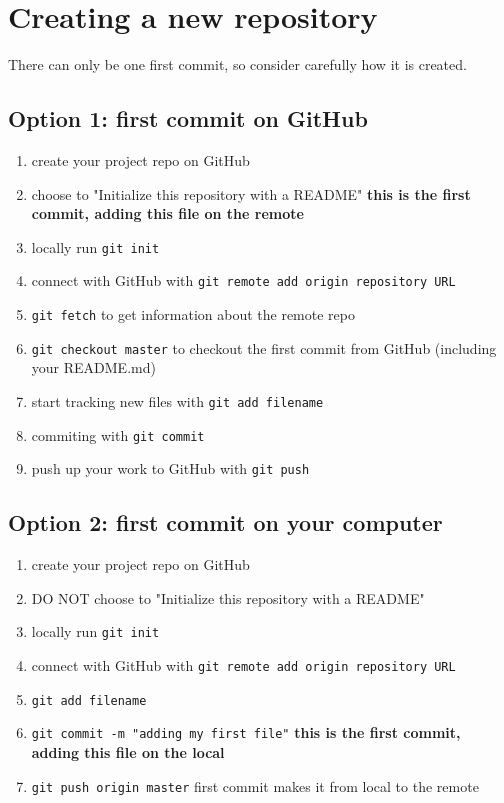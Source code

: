 \section{Creating a new repository}

There can only be one first commit, so consider carefully how it is created.

\subsection{Option 1: first commit on GitHub}

\begin{enumerate}
    \item create your project repo on GitHub
    \item choose to "Initialize this repository with a README" \textbf{this is the first commit, adding this file on the remote}
    \item locally run \texttt{git init}
    \item connect with GitHub with \texttt{git remote add origin {repository URL}}
    \item \texttt{git fetch} to get information about the remote repo
    \item \texttt{git checkout master} to checkout the first commit from GitHub (including your README.md)
    \item start tracking new files with \texttt{git add {filename}}
    \item commiting with \texttt{git commit}
    \item push up your work to GitHub with \texttt{git push}
\end{enumerate}

\subsection{Option 2: first commit on your computer}

\begin{enumerate}
    \item create your project repo on GitHub
    \item DO NOT choose to "Initialize this repository with a README"
    \item locally run \texttt{git init}
    \item connect with GitHub with \texttt{git remote add origin {repository URL}}
    \item \texttt{git add {filename}}
    \item \texttt{git commit -m "adding my first file"} \textbf{this is the first commit, adding this file on the local}
    \item \texttt{git push origin master} first commit makes it from local to the remote
\end{enumerate}

